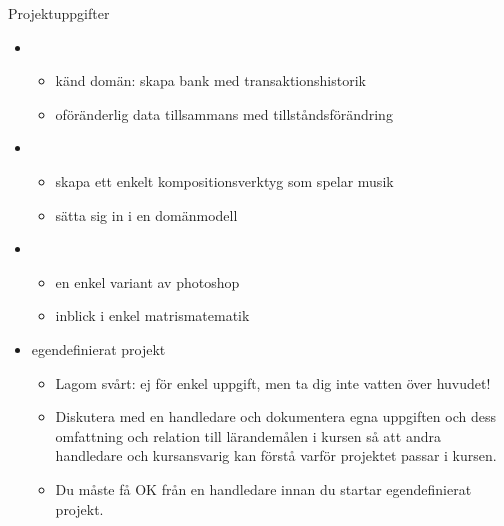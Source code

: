 \begin{Slide}{Projektuppgifter}\SlideFontTiny

\begin{itemize}\SlideFontTiny
\item {}
\begin{itemize}\SlideFontTiny
\item känd domän: skapa bank med transaktionshistorik 
\item oföränderlig data tillsammans med tillståndsförändring
\end{itemize}


\item {}
\begin{itemize}\SlideFontTiny
\item skapa ett enkelt kompositionsverktyg som spelar musik
\item sätta sig in i en domänmodell
\end{itemize}

\item {} 
\begin{itemize}\SlideFontTiny
\item en enkel variant av photoshop 
\item inblick i enkel matrismatematik
\end{itemize}


\item egendefinierat projekt 
\begin{itemize}\SlideFontTiny
\item Lagom svårt: ej för enkel uppgift, men ta dig inte vatten över huvudet!
\item Diskutera med en handledare och dokumentera egna uppgiften och dess omfattning och relation till lärandemålen i kursen så att andra handledare och kursansvarig kan förstå varför projektet passar i kursen.
\item Du måste få OK från en handledare innan du startar egendefinierat projekt.
\end{itemize}


\end{itemize}

\end{Slide}

